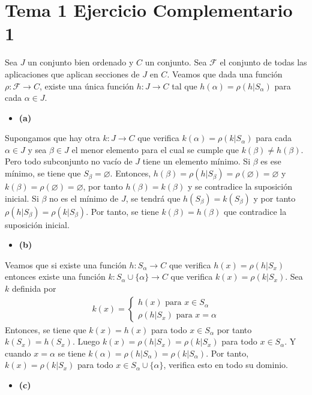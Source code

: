 \documentclass{article}
\begin{document}
\section{Tema 1 Ejercicio Complementario 1}
Sea $J$ un conjunto bien ordenado y $C$ un conjunto. Sea $\mathcal{F}$ el conjunto de todas las aplicaciones que aplican secciones de $J$ en $C$. Veamos que dada una función $\rho:\mathcal{F}\rightarrow C$, existe una única función $h:J\rightarrow C$ tal que $h(\alpha)=\rho(h|S_{\alpha})$ para cada $\alpha\in J$. 
\begin{itemize}
\item \bf(a)\rm
\end{itemize}
Supongamos que hay otra $k:J\rightarrow C$ que verifica $k(\alpha)=\rho(k|S_{\alpha})$  para cada $\alpha\in J$ y sea $\beta\in J$ el menor elemento para el cual se cumple que $k(\beta)\neq h(\beta)$. Pero todo subconjunto no vacío de $J$ tiene un elemento mínimo. Si $\beta$ es ese mínimo, se tiene que $S_{\beta}=\varnothing$. Entonces, $h(\beta)=\rho(h|S_{\beta})=\rho(\varnothing)=\varnothing$ y $k(\beta)=\rho(\varnothing)=\varnothing$, por tanto $h(\beta)=k(\beta)$ y se contradice la suposición inicial. Si $\beta$ no es el mínimo de $J$, se tendrá que $h(S_{\beta})=k(S_{\beta})$ y por tanto $\rho(h|S_{\beta})=\rho(k|S_{\beta})$. Por tanto, se tiene $k(\beta)=h(\beta)$ que contradice la suposición inicial. 
\begin{itemize}
\item \bf(b)\rm
\end{itemize}
Veamos que si existe una función $h:S_{\alpha}\rightarrow C$ que verifica $h(x)=\rho(h|S_{x})$ entonces existe una función $k:S_{\alpha}\cup\{\alpha\}\rightarrow C$ que verifica $k(x)=\rho(k|S_{x})$.
Sea $k$ definida por
\begin{eqnarray}
k(x)=\begin{cases}
h(x)\text{ para } x\in S_{\alpha}\nonumber\\
\rho(h|S_x)\text{ para }x=\alpha
\end{cases}
\end{eqnarray}
Entonces, se tiene que $k(x)=h(x)$ para todo $x\in S_{\alpha}$ por tanto $k(S_x)=h(S_x)$. Luego $k(x)=\rho(h|S_x)=\rho(k|S_x)$ para todo $x\in S_{\alpha}$. Y cuando $x=\alpha$ se tiene $k(\alpha)=\rho(h|S_{\alpha})=\rho(k|S_{\alpha})$. Por tanto, 
$k(x)=\rho(k|S_x)$ para todo $x\in S_{\alpha}\cup\{\alpha\}$,  verifica esto en todo su dominio.
\begin{itemize}
\item \bf(c)\rm
\end{itemize}
\end{document}
